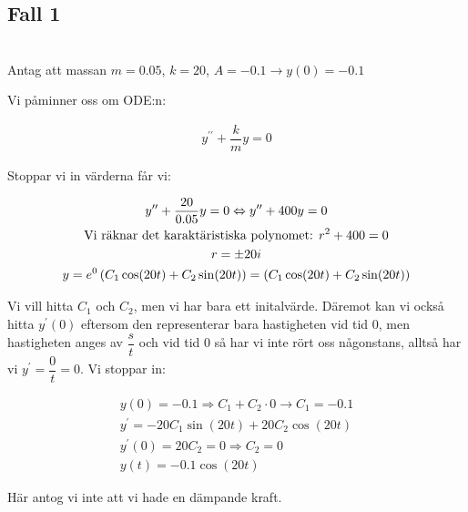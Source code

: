 \subsection{Fall 1}\hfill\\
\noindent Antag att massan $m=0.05$, $k = 20$, $A=-0.1\rightarrow y(0)=-0.1$
\par\bigskip
\noindent Vi påminner oss om ODE:n:

\begin{equation*}
  \begin{gathered}
    y^{\prime\prime}+\dfrac{k}{m}y=0
  \end{gathered}
\end{equation*}
\par\bigskip
\noindent Stoppar vi in värderna får vi:


\begin{equation*}
  \begin{gathered}
    y^{\prime\prime}+\dfrac{20}{0.05}y=0 \Leftrightarrow y^{\prime\prime}+400y=0\\
    \text{Vi räknar det karaktäristiska polynomet: } r^2+400 = 0\\
    r = \pm20i\\
    y=e^0\left(C_1\cos(20t)+C_2\sin(20t)\right) = \left(C_1\cos(20t)+C_2\sin(20t)\right)
  \end{gathered}
\end{equation*}
\par\bigskip
\noindent Vi vill hitta $C_1$ och $C_2$, men vi har bara ett initalvärde. Däremot kan vi också hitta $y^{\prime}(0)$ eftersom den representerar bara hastigheten vid tid 0, men hastigheten anges av $\dfrac{s}{t}$ och vid tid 0 så har vi inte rört oss någonstans, alltså har vi $y^{\prime} = \dfrac{0}{t}=0$. Vi stoppar in:


\begin{equation*}
  \begin{gathered}
    y(0) = -0.1\Rightarrow C_1+C_2\cdot0 \rightarrow C_1=-0.1\\
    y^{\prime}=-20C_1\sin(20t)+20C_2\cos(20t)\\
    y^{\prime}(0)=20C_2 = 0 \Rightarrow C_2 =0\\
    y(t)=-0.1\cos(20t)
  \end{gathered}
\end{equation*}
\par\bigskip
\noindent Här antog vi inte att vi hade en dämpande kraft. 
